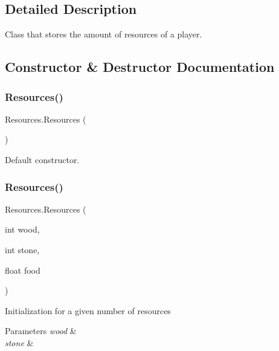 \subsection{Detailed Description}
Class that stores the amount of resources of a player. 



\subsection{Constructor \& Destructor Documentation}
\mbox{\label{class_resources_a44d30192ea26df342b18e624ba343eb0}} 
\subsubsection{\texorpdfstring{Resources()}{Resources()}\hspace{0.1cm}{\footnotesize\ttfamily [1/2]}}
{\footnotesize\ttfamily Resources.\+Resources (\begin{DoxyParamCaption}{ }\end{DoxyParamCaption})}



Default constructor. 

\mbox{\label{class_resources_a9def630f13f3769b0298e3a080a93fa8}} 
\subsubsection{\texorpdfstring{Resources()}{Resources()}\hspace{0.1cm}{\footnotesize\ttfamily [2/2]}}
{\footnotesize\ttfamily Resources.\+Resources (\begin{DoxyParamCaption}\item[{int}]{wood,  }\item[{int}]{stone,  }\item[{float}]{food }\end{DoxyParamCaption})}



Initialization for a given number of resources 


\begin{DoxyParams}{Parameters}
{\em wood} & \\
\hline
{\em stone} & \\
\hline
\end{DoxyParams}


